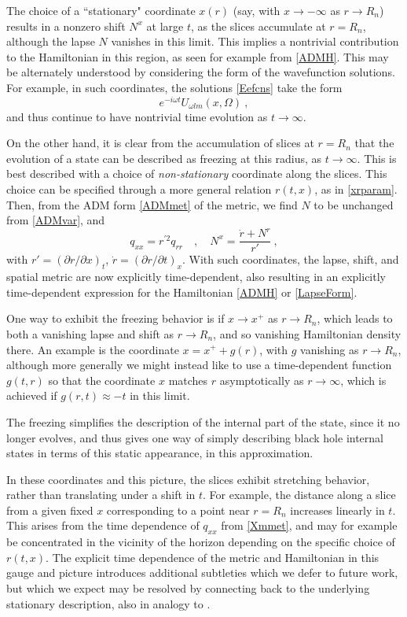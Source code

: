 \documentclass[12pt]{article}
\numberwithin{equation}{section}
\newcommand{\beq}{\begin{equation}}
\newcommand{\eeq}{\end{equation}}
\begin{document}
The choice of a ``stationary" coordinate $x(r)$ (say, with $x\rightarrow -\infty$ as $r\rightarrow R_n$) results in a nonzero shift $N^x$ at large $t$, as the slices accumulate at $r=R_n$, although the lapse $N$ vanishes in this limit.  This implies a nontrivial contribution to the Hamiltonian in this region, as seen for example from \eqref{ADMH}.  This may be alternately understood by considering the form of the wavefunction solutions.  For example, in such coordinates, the solutions \eqref{Eefcns} take the form 
\beq
e^{-i\omega t} U_{\omega lm}(x,\Omega)\ ,
\eeq
and thus continue to have nontrivial time evolution as $t\rightarrow\infty$.

On the other hand, it is clear from the accumulation of slices at $r=R_n$ that the evolution of a state can be described as freezing\cite{QBHB}\cite{BHQIUE} at this radius, as $t\rightarrow \infty$.  This is best described with a choice of {\it non-stationary} coordinate along the slices.  This choice can be specified through a more general relation $r(t,x)$, as in \eqref{xrparam}.  Then, from the ADM form \eqref{ADMmet} of the metric, we find $N$ to be unchanged from \eqref{ADMvar}, and
\beq\label{Xmmet}
q_{xx}=r^{\prime 2} q_{rr}\quad ,\quad N^x = \frac{\dot r + N^r}{r'}\ ,
\eeq
with $r'=(\partial r/\partial x)_t$, $\dot r= (\partial r/\partial t)_x$.  With such coordinates, the lapse, shift, and spatial metric are now explicitly time-dependent, also resulting in an explicitly time-dependent expression for the Hamiltonian \eqref{ADMH} or \eqref{LapseForm}.  

One way to exhibit the freezing behavior is if $x\rightarrow x^+$ as $r\rightarrow R_n$, which leads to both a vanishing lapse and shift as $r\rightarrow R_n$, and so vanishing Hamiltonian density there.  An example\cite{SE2d} is the coordinate $x=x^+ + g(r)$, with $g$ vanishing as $r\rightarrow R_n$, although more generally we might  instead like to use a time-dependent function $g(t,r)$ so that the coordinate $x$ matches $r$ asymptotically as $r\rightarrow\infty$, which is achieved if $g(r,t)\approx -t$ in this limit.  

The freezing simplifies the description of the internal part of the state, since it no longer evolves, and thus gives one way of simply describing black hole internal states in terms of this static appearance, in this approximation.  

In these coordinates and this picture, the slices exhibit stretching behavior, rather than translating under a shift in $t$.  For example, the distance along a slice from a given fixed $x$ corresponding to a point near $r=R_n$ increases linearly in $t$.  This arises from the time dependence of $q_{xx}$ from \eqref{Xmmet}, and may for example be concentrated in the vicinity of the horizon depending on the specific choice of $r(t,x)$.  
 The explicit time dependence of the metric and Hamiltonian in this gauge  and picture introduces additional subtleties which we defer to future work, but which we expect may be resolved by connecting back to the underlying stationary description, also in analogy to \cite{MuOe}.  
\end{document}
